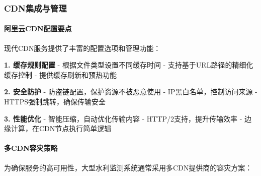 \subsubsection{CDN集成与管理}\label{cdnux96c6ux6210ux4e0eux7ba1ux7406}

\paragraph{阿里云CDN配置要点}\label{ux963fux91ccux4e91cdnux914dux7f6eux8981ux70b9}

现代CDN服务提供了丰富的配置选项和管理功能：

\textbf{1. 缓存规则配置} - 根据文件类型设置不同缓存时间 - 支持基于URL路径的精细化缓存控制 - 提供缓存刷新和预热功能

\textbf{2. 安全防护} - 防盗链配置，保护资源不被恶意使用 - IP黑白名单，控制访问来源 - HTTPS强制跳转，确保传输安全

\textbf{3. 性能优化} - 智能压缩，自动优化传输内容 - HTTP/2支持，提升传输效率 - 边缘计算，在CDN节点执行简单逻辑

\paragraph{多CDN容灾策略}\label{ux591acdnux5bb9ux707eux7b56ux7565}

为确保服务的高可用性，大型水利监测系统通常采用多CDN提供商的容灾方案：

